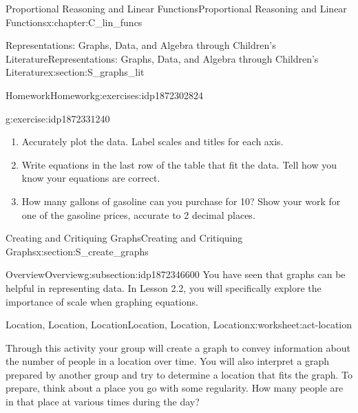 \documentclass[oneside,10pt,]{book}
\numberwithin{equation}{chapter}
\newcommand{\hrulethin}  {\noalign{\hrule height 0.04em}}
\begin{document}
\begin{chapterptx}{Proportional Reasoning and Linear Functions}{}{Proportional Reasoning and Linear Functions}{}{}{x:chapter:C_lin_funcs}
\begin{sectionptx}{Representations: Graphs, Data, and Algebra through Children's Literature}{}{Representations: Graphs, Data, and Algebra through Children's Literature}{}{}{x:section:S_graphs_lit}
\begin{exercises-subsection}{Homework}{}{Homework}{}{}{g:exercises:idp1872302824}
\begin{divisionexercise}{5}{}{}{g:exercise:idp1872331240}
\begin{enumerate}[font=\bfseries,label=(\alph*),ref=\alph*]
\begin{tableptx}{\textbf{Table of Gas Prices}}{x:table:tbl-gas-prices}{}
{\begin{tabular}{Accc}
&&\tabularnewline\hrulethin
\end{tabular}
}%
\end{tableptx}%
\item{}Accurately plot the data. Label scales and titles for each axis.%
\item{}Write equations in the last row of the table that fit the data. Tell how you know your equations are correct.%
\item{}How many gallons of gasoline can you purchase for \textdollar{}10? Show your work for one of the gasoline prices, accurate to 2 decimal places.%
\end{enumerate}
\end{divisionexercise}%
\end{exercises-subsection}
\end{sectionptx}
%
%
\typeout{************************************************}
\typeout{************************************************}
%
\begin{sectionptx}{Creating and Critiquing Graphs}{}{Creating and Critiquing Graphs}{}{}{x:section:S_create_graphs}
%
%
\typeout{************************************************}
\typeout{************************************************}
%
\begin{subsectionptx}{Overview}{}{Overview}{}{}{g:subsection:idp1872346600}
You have seen that graphs can be helpful in representing data. In Lesson 2.2, you will specifically explore the importance of scale when graphing equations.%
\end{subsectionptx}
%
%
\typeout{************************************************}
\typeout{************************************************}
%
\begin{worksheet-subsection}{Location, Location, Location}{}{Location, Location, Location}{}{}{x:worksheet:act-location}
\begin{introduction}{}%
Through this activity your group will create a graph to convey information about the number of people in a location over time. You will also interpret a graph prepared by another group and try to determine a location that fits the graph. To prepare, think about a place you go with some regularity. How many people are in that place at various times during the day?%
\par

\end{introduction}
\end{worksheet-subsection}
\end{sectionptx}
\end{chapterptx}
\end{document}

